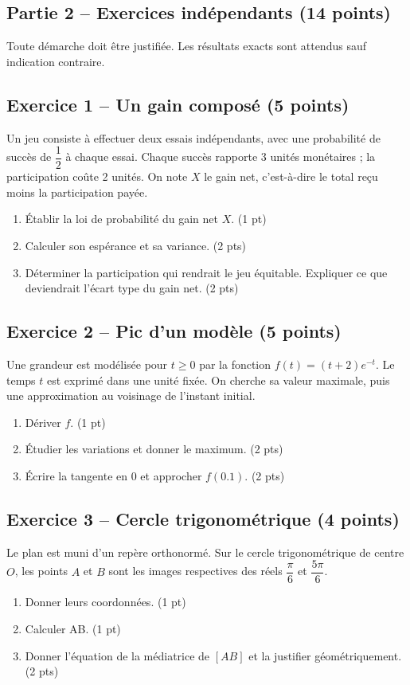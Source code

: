 \mxnewpage\subsection*{Partie 2 -- Exercices indépendants (14 points)}
Toute démarche doit être justifiée. Les résultats exacts sont attendus sauf indication contraire.
\subsection*{Exercice 1 -- Un gain composé (5 points)}
Un jeu consiste à effectuer deux essais indépendants, avec une probabilité de succès de $\dfrac12$ à chaque essai. Chaque succès rapporte 3 unités monétaires ; la participation coûte 2 unités. On note $X$ le gain net, c’est-à-dire le total reçu moins la participation payée.
\begin{enumerate}
\item Établir la loi de probabilité du gain net $X$. \hfill(1 pt)
\item Calculer son espérance et sa variance. \hfill(2 pts)
\item Déterminer la participation qui rendrait le jeu équitable. Expliquer ce que deviendrait l’écart type du gain net. \hfill(2 pts)
\end{enumerate}
\subsection*{Exercice 2 -- Pic d’un modèle (5 points)}
Une grandeur est modélisée pour $t\geq0$ par la fonction $f(t)=(t+2)e^{-t}$. Le temps $t$ est exprimé dans une unité fixée. On cherche sa valeur maximale, puis une approximation au voisinage de l’instant initial.
\begin{enumerate}
\item Dériver $f$. \hfill(1 pt)
\item Étudier les variations et donner le maximum. \hfill(2 pts)
\item Écrire la tangente en 0 et approcher $f(\num{0,1})$. \hfill(2 pts)
\end{enumerate}
\subsection*{Exercice 3 -- Cercle trigonométrique (4 points)}
Le plan est muni d’un repère orthonormé. Sur le cercle trigonométrique de centre $O$, les points $A$ et $B$ sont les images respectives des réels $\dfrac\pi6$ et $\dfrac{5\pi}6$.
\begin{enumerate}
\item Donner leurs coordonnées. \hfill(1 pt)
\item Calculer AB. \hfill(1 pt)
\item Donner l’équation de la médiatrice de $[AB]$ et la justifier géométriquement. \hfill(2 pts)
\end{enumerate}
